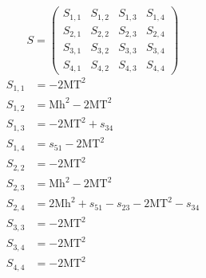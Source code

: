 \documentclass[a4paper]{article}
\begin{document}
\begin{equation}
S=\left(\begin{array}{cccc}
   S_{1,1}&
   S_{1,2}&
   S_{1,3}&
   S_{1,4}\\
   S_{2,1}&
   S_{2,2}&
   S_{2,3}&
   S_{2,4}\\
   S_{3,1}&
   S_{3,2}&
   S_{3,3}&
   S_{3,4}\\
   S_{4,1}&
   S_{4,2}&
   S_{4,3}&
   S_{4,4}\end{array}\right)
\end{equation}
\begin{subequations}
\begin{align}
   S_{1,1}&=-2\text{MT}^2\\
   S_{1,2}&=\text{Mh}^2-2\text{MT}^2\\
   S_{1,3}&=-2\text{MT}^2+s_{34}\\
   S_{1,4}&=s_{51}-2\text{MT}^2\\
   S_{2,2}&=-2\text{MT}^2\\
   S_{2,3}&=\text{Mh}^2-2\text{MT}^2\\
   S_{2,4}&=2\text{Mh}^2+s_{51}-s_{23}-2\text{MT}^2-s_{34}\\
   S_{3,3}&=-2\text{MT}^2\\
   S_{3,4}&=-2\text{MT}^2\\
   S_{4,4}&=-2\text{MT}^2
\end{align}
\end{subequations}
\end{document}
